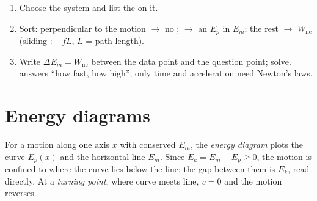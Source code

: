 \begin{method}\label{met:g12:work-and-energy:audit}
\begin{enumerate}
  \item Choose the system and list the  on it.
  \item Sort: perpendicular to the motion $\to$ no ; 
        $\to$ an $E_p$ in $E_m$; the rest $\to$ $W_{\text{nc}}$
        (sliding : $-fL$, $L$ = path length).
  \item Write $\Delta E_m = W_{\text{nc}}$ between the data point and
        the question point; solve.  answers ``how fast, how
        high''; only time and acceleration need Newton's laws.
\end{enumerate}
\end{method}

\section{Energy diagrams}

\begin{definition}\label{def:g12:work-and-energy:diagram}
For a motion along one axis $x$ with conserved $E_m$, the
\emph{energy diagram} plots the curve $E_p(x)$
and the horizontal line $E_m$. Since $E_k = E_m - E_p \geq 0$, the
motion is confined to where the curve lies below the line; the gap
between them is $E_k$, read directly. At a
\emph{turning point}, where curve meets line,
$v = 0$ and the motion reverses.
\end{definition}

